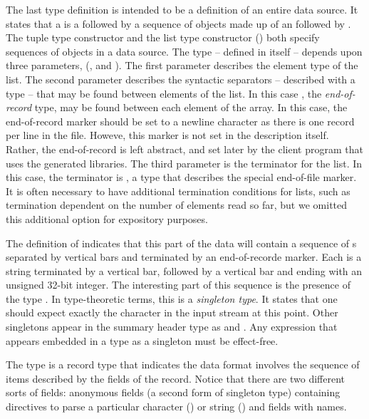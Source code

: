 The last type definition  is intended to be a definition of
an entire \dibbler{} data source.  It states that a  is a
 followed by a sequence of objects made up of an
 followed by .  The tuple type
constructor  and the list type constructor
() both specify sequences of objects in a
data source.  The  type -- defined in \padsml{} itself --
depends upon three parameters, (, and ).
The first parameter describes the element type of the list. The second
parameter describes the syntactic separators -- described with a type
-- that may be found between elements of the list.  In this case
, the {\em end-of-record} type, may be found between each
element of the array.  In this case, the end-of-record marker should
be set to a newline character as there is one record per line in the
file. Howeve, this marker is not set in the description itself.
Rather, the end-of-record is left abstract, and set later by the
client program that uses the generated libraries. The third parameter
is the terminator for the list.  In this case, the terminator is
, a type that describes the special end-of-file marker.  It
is often necessary to have additional termination conditions for
lists, such as termination dependent on the number of elements read so
far, but we omitted this additional option for expository purposes.

The definition of  indicates that this part of the
\dibbler{} data will contain a sequence of s separated by
vertical bars and terminated by an end-of-recorde marker.  Each
 is a string terminated by a vertical bar, followed by a
vertical bar and ending with an unsigned 32-bit integer.  The
interesting part of this sequence is the presence of the type
.  In type-theoretic terms, this is a {\em singleton type}.
It states that one should expect exactly the character  in the
input stream at this point.  Other singletons appear in the summary
header type as  and .  Any expression that appears
embedded in a type as a singleton must be effect-free.

The type  is a record type that indicates the data
format involves the sequence of items described by the fields of the
record.  Notice that there are two different sorts of fields:
anonymous fields (a second form of singleton type) containing
directives to parse a particular character () or string
() and fields with names.

